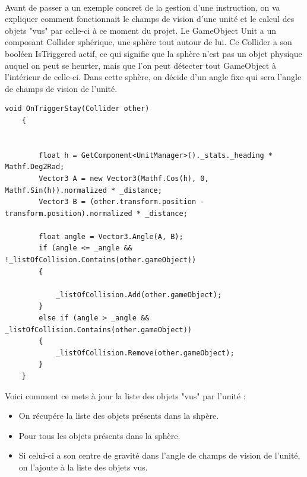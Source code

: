 \documentclass{report}
\begin{document}
\paragraph{}Avant de passer a un exemple concret de la gestion d'une instruction, on va expliquer comment fonctionnait le champs de vision d'une unité et le calcul des objets "vus" par celle-ci à ce moment du projet.
Le GameObject Unit a un composant Collider sphérique, une sphère tout autour de lui. Ce Collider a son booléen IsTriggered actif, ce qui signifie que la sphère n'est pas un objet physique auquel on peut se heurter, mais que l'on peut détecter tout GameObject à l'intérieur de celle-ci. Dans cette sphère, on décide d'un angle fixe qui sera l'angle de champs de vision de l'unité.
\begin{lstlisting}[language={[Sharp]C},label={lst:unitScript}, caption=  Extrait du code du script Sight.cs première version.]
    void OnTriggerStay(Collider other)
    {
      

        float h = GetComponent<UnitManager>()._stats._heading * Mathf.Deg2Rad;
        Vector3 A = new Vector3(Mathf.Cos(h), 0, Mathf.Sin(h)).normalized * _distance;
        Vector3 B = (other.transform.position - transform.position).normalized * _distance;

        float angle = Vector3.Angle(A, B);
        if (angle <= _angle && !_listOfCollision.Contains(other.gameObject))
        {
            
            _listOfCollision.Add(other.gameObject);
        }
        else if (angle > _angle && _listOfCollision.Contains(other.gameObject))
        {
            _listOfCollision.Remove(other.gameObject);
        }
    }
\end{lstlisting}
Voici comment ce mets à jour la liste des objets "vus" par l'unité :
\begin{itemize}
\item On récupére la liste des objets présents dans la shpère.
\item Pour tous les objets présents dans la sphère.
\item Si celui-ci a son centre de gravité dans l'angle de champs de vision de l'unité, on l'ajoute à la liste des objets vus.
\end{itemize}
\end{document}
